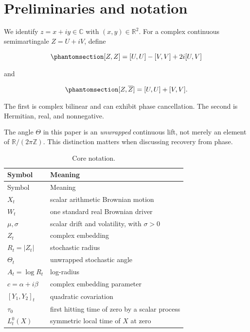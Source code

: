 \documentclass[
  english,
  10pt,
  letterpaper,
  DIV=11,
  numbers=noendperiod]{scrartcl}
\theoremstyle{plain}
\theoremstyle{remark}
\begin{document}
\section{Preliminaries and notation}\label{sec-preliminaries}

We identify \(z=x+iy\in\mathbb C\) with \((x,y)\in\mathbb R^2\). For a
complex continuous semimartingale \(Z=U+iV\), define

\begin{equation}\protect\phantomsection\label{eq-bilinear-bracket}{
[Z,Z]=[U,U]-[V,V]+2i[U,V]
}\end{equation}

and

\begin{equation}\protect\phantomsection\label{eq-hermitian-bracket}{
[Z,\overline Z]=[U,U]+[V,V].
}\end{equation}

The first is complex bilinear and can exhibit phase cancellation. The
second is Hermitian, real, and nonnegative.

The angle \(\Theta\) in this paper is an \emph{unwrapped} continuous
lift, not merely an element of \(\mathbb R/(2\pi\mathbb Z)\). This
distinction matters when discussing recovery from phase.

\begin{longtable}[]{@{}ll@{}}
\caption{Core notation.}\label{tbl-notation}\tabularnewline
\toprule\noalign{}
Symbol & Meaning \\
\midrule\noalign{}
\endfirsthead
\toprule\noalign{}
Symbol & Meaning \\
\midrule\noalign{}
\endhead
\bottomrule\noalign{}
\endlastfoot
\(X_t\) & scalar arithmetic Brownian motion \\
\(W_t\) & one standard real Brownian driver \\
\(\mu,\sigma\) & scalar drift and volatility, with \(\sigma>0\) \\
\(Z_t\) & complex embedding \\
\(R_t=\lvert Z_t\rvert\) & stochastic radius \\
\(\Theta_t\) & unwrapped stochastic angle \\
\(A_t=\log R_t\) & log-radius \\
\(c=\alpha+i\beta\) & complex embedding parameter \\
\([Y_1,Y_2]_t\) & quadratic covariation \\
\(\tau_0\) & first hitting time of zero by a scalar process \\
\(L_t^0(X)\) & symmetric local time of \(X\) at zero \\
\end{longtable}
\end{document}
